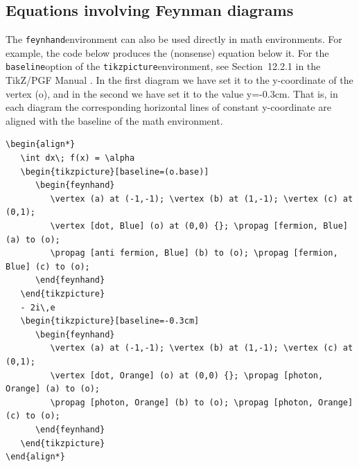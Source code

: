 \documentclass[10pt,letterpaper,twoside,notitlepage]{article}
\numberwithin{figure}{section}
\begin{document}
\subsection{Equations involving Feynman diagrams}
%
The \vercol\verb$feynhand$\txcol environment can also be used directly
in math environments. For example, the code below produces the (nonsense) equation below it.
For the \vercol\verb$baseline$\txcol option of the
\vercol\verb$tikzpicture$\txcol environment, see Section~12.2.1
in the TikZ/PGF Manual \cite{tikz}.
In the first diagram we have set it to the y-coordinate of the vertex (o),
and in the second we have set it to the value y=-0.3cm.
That is, in each diagram the corresponding horizontal lines of constant y-coordinate 
are aligned with the baseline of the math environment.
%
\vercol\begin{verbatim}
\begin{align*}
   \int dx\; f(x) = \alpha
   \begin{tikzpicture}[baseline=(o.base)]
      \begin{feynhand}
         \vertex (a) at (-1,-1); \vertex (b) at (1,-1); \vertex (c) at (0,1); 
         \vertex [dot, Blue] (o) at (0,0) {}; \propag [fermion, Blue] (a) to (o);
         \propag [anti fermion, Blue] (b) to (o); \propag [fermion, Blue] (c) to (o);
      \end{feynhand}
   \end{tikzpicture}
   - 2i\,e
   \begin{tikzpicture}[baseline=-0.3cm]
      \begin{feynhand}
         \vertex (a) at (-1,-1); \vertex (b) at (1,-1); \vertex (c) at (0,1); 
         \vertex [dot, Orange] (o) at (0,0) {}; \propag [photon, Orange] (a) to (o);
         \propag [photon, Orange] (b) to (o); \propag [photon, Orange] (c) to (o);
      \end{feynhand}
   \end{tikzpicture}
\end{align*}
\end{verbatim}\txcol
%
\vspace{-13mm}
%
\end{document}
